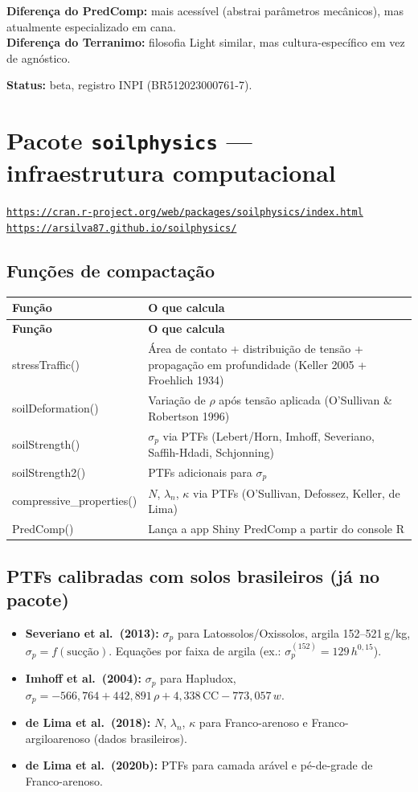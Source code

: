 \documentclass[12pt,a4paper]{article}
\newcommand{\Section}[1]{\needspace{12\baselineskip}\section{#1}}
\newcommand{\SubsectionKeep}[1]{\needspace{10\baselineskip}\subsection{#1}}
\newcommand{\Link}[1]{\href{#1}{\nolinkurl{#1}}}
\newenvironment{NoBreakItemize}
{\begin{samepage}\begin{itemize}}
{\end{itemize}\end{samepage}}
\begin{document}
\textbf{Diferença do PredComp:} mais acessível (abstrai parâmetros mecânicos), mas atualmente especializado em cana.\\
\textbf{Diferença do Terranimo:} filosofia Light similar, mas cultura-específico em vez de agnóstico.

\textbf{Status:} beta, registro INPI (BR512023000761-7).

\Section{Pacote \texttt{soilphysics} --- infraestrutura computacional}

\Link{https://cran.r-project.org/web/packages/soilphysics/index.html}\\
\Link{https://arsilva87.github.io/soilphysics/}

\SubsectionKeep{Funções de compactação}

\begin{longtable}{>{\ttfamily\raggedright}p{4.2cm} >{\raggedright\arraybackslash}p{9cm}}
\toprule
\textrm{\textbf{Função}} & \textbf{O que calcula} \\
\midrule
\endfirsthead
\toprule
\textrm{\textbf{Função}} & \textbf{O que calcula} \\
\midrule
\endhead
\bottomrule
\endfoot
stressTraffic()         & Área de contato + distribuição de tensão + propagação em profundidade (Keller 2005 + Froehlich 1934) \\
soilDeformation()       & Variação de $\rho$ após tensão aplicada (O'Sullivan \& Robertson 1996) \\
soilStrength()          & $\sigma_p$ via PTFs (Lebert/Horn, Imhoff, Severiano, Saffih-Hdadi, Schjonning) \\
soilStrength2()         & PTFs adicionais para $\sigma_p$ \\
compressive\_properties() & $N$, $\lambda_n$, $\kappa$ via PTFs (O'Sullivan, Defossez, Keller, de Lima) \\
PredComp()              & Lança a app Shiny PredComp a partir do console R \\
\end{longtable}

\SubsectionKeep{PTFs calibradas com solos brasileiros (já no pacote)}

\begin{NoBreakItemize}
  \item \textbf{Severiano et al.\ (2013):} $\sigma_p$ para Latossolos/Oxissolos, argila 152--521\,g/kg, $\sigma_p = f(\text{sucção})$. Equações por faixa de argila (ex.: $\sigma_p^{(152)} = 129\,h^{0{,}15}$).
  \item \textbf{Imhoff et al.\ (2004):} $\sigma_p$ para Hapludox, $\sigma_p = -566{,}764 + 442{,}891\,\rho + 4{,}338\,\text{CC} - 773{,}057\,w$.
  \item \textbf{de Lima et al.\ (2018):} $N$, $\lambda_n$, $\kappa$ para Franco-arenoso e Franco-argiloarenoso (dados brasileiros).
  \item \textbf{de Lima et al.\ (2020b):} PTFs para camada arável e pé-de-grade de Franco-arenoso.
\end{NoBreakItemize}
\end{document}

